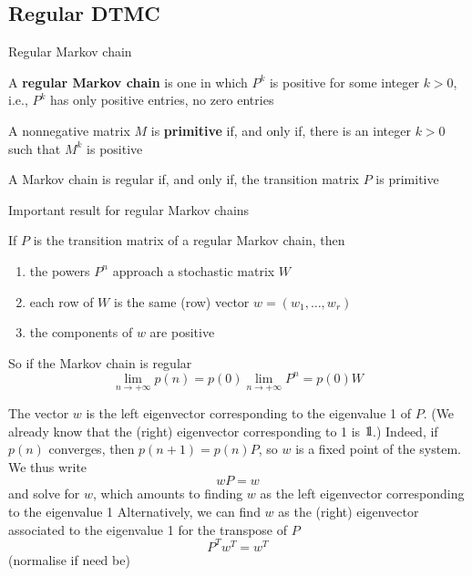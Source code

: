 \documentclass[aspectratio=169]{beamer}
\begin{document}
\subsection{Regular DTMC}

\begin{frame}{Regular Markov chain}
    \begin{definition}
        A \textbf{regular Markov chain} is one in which $P^k$ is positive for some integer $k>0$, i.e., $P^k$ has only positive entries, no zero entries
    \end{definition}    
    \vfill
    \begin{definition}
        A nonnegative matrix $M$ is \textbf{primitive} if, and only if, there is an integer $k>0$ such that $M^k$ is positive
    \end{definition}
    \begin{theorem}
        A Markov chain is regular if, and only if, the transition matrix $P$ is primitive
    \end{theorem}
\end{frame}


\begin{frame}{Important result for regular Markov chains}
    \begin{theorem}
    If $P$ is the transition matrix of a regular Markov chain, then
    \begin{enumerate}
        \item the powers $P^n$ approach a stochastic matrix $W$
        \item each row of $W$ is the same (row) vector $w=(w_1,\ldots,w_r)$
        \item the components of $w$ are positive
    \end{enumerate}
    \end{theorem}
    \vfill
    So if the Markov chain is regular
    $$
    \lim_{n\rightarrow +\infty}p(n)=p(0)\lim_{n\rightarrow +\infty}P^n
    =p(0)W
    $$
\end{frame}


\begin{frame}
    The vector $w$ is the left eigenvector corresponding to the eigenvalue 1 of $P$. (We already know that the (right) eigenvector corresponding to 1 is $\nbOne$.)
\vfill
    Indeed, if $p(n)$ converges, then $p(n+1)=p(n)P$, so $w$ is a fixed point of the system. We thus write
    $$
    wP=w
    $$
    and solve for $w$, which amounts to finding $w$ as the left eigenvector corresponding to the eigenvalue 1
    \vfill
    Alternatively, we can find $w$ as the (right) eigenvector associated to the eigenvalue 1 for the transpose of $P$
    $$
    P^Tw^T=w^T
    $$  
    \vfill
    (normalise if need be)      
\end{frame}
\end{document}

